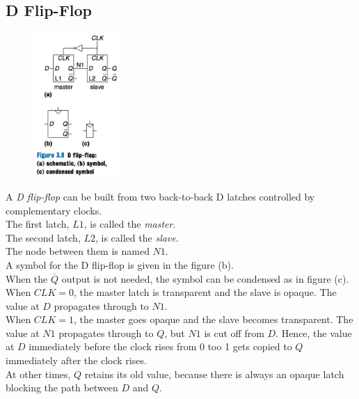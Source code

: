 \documentclass[12pt]{article}
\theoremstyle{definition}
\begin{document}
  \subsection{D Flip-Flop}
  \begin{figure}
    \centering
    \includegraphics[width=0.3\textwidth]{pictures/dFlipFlop.png}
  \end{figure}
  A \emph{D flip-flop} can be built from two back-to-back D latches controlled by complementary clocks. \\
  The first latch, $L1$, is called the \emph{master}. \\
  The second latch, $L2$, is called the \emph{slave}. \\
  The node between them is named $N1$. \\
  A symbol for the D flip-flop is given in the figure (b). \\
  When the $\overline{Q}$ output is not needed, the symbol can be condensed as in figure (c). \\

  When $CLK = 0$, the master latch is transparent and the slave is opaque.
  The value at $D$ propagates through to $N1$. \\
  When $CLK = 1$, the master goes opaque and the slave becomes transparent.
  The value at $N1$ propagates through to $Q$, but $N1$ is cut off from $D$.
  Hence, the value at $D$ immediately before the clock rises from 0 too 1 gets copied to $Q$ immediately after the clock rises. \\
  At other times, $Q$ retains its old value, because there is always an opaque latch blocking the path between $D$ and $Q$.
\end{document}
